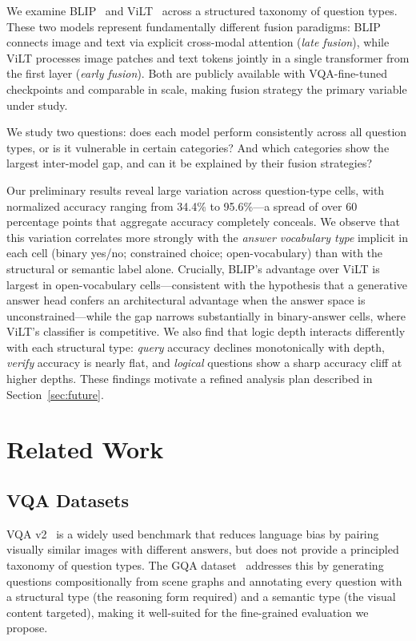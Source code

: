 \documentclass[11pt]{article}
\begin{document}
We examine BLIP~\cite{li2022blip} and ViLT~\cite{kim2021vilt} across a structured taxonomy of question types. These two models represent fundamentally different fusion paradigms: BLIP connects image and text via explicit cross-modal attention (\emph{late fusion}), while ViLT processes image patches and text tokens jointly in a single transformer from the first layer (\emph{early fusion}). Both are publicly available with VQA-fine-tuned checkpoints and comparable in scale, making fusion strategy the primary variable under study.

We study two questions: does each model perform consistently across all question types, or is it vulnerable in certain categories? And which categories show the largest inter-model gap, and can it be explained by their fusion strategies?

Our preliminary results reveal large variation across question-type cells, with normalized accuracy ranging from 34.4\% to 95.6\%---a spread of over 60 percentage points that aggregate accuracy completely conceals. We observe that this variation correlates more strongly with the \emph{answer vocabulary type} implicit in each cell (binary yes/no; constrained choice; open-vocabulary) than with the structural or semantic label alone. Crucially, BLIP's advantage over ViLT is largest in open-vocabulary cells---consistent with the hypothesis that a generative answer head confers an architectural advantage when the answer space is unconstrained---while the gap narrows substantially in binary-answer cells, where ViLT's classifier is competitive. We also find that logic depth interacts differently with each structural type: \textit{query} accuracy declines monotonically with depth, \textit{verify} accuracy is nearly flat, and \textit{logical} questions show a sharp accuracy cliff at higher depths. These findings motivate a refined analysis plan described in Section~\ref{sec:future}.

\section{Related Work}

\subsection{VQA Datasets}
VQA v2~\cite{goyal2017making} is a widely used benchmark that reduces language bias by pairing visually similar images with different answers, but does not provide a principled taxonomy of question types. The GQA dataset~\cite{hudson2019gqa} addresses this by generating questions compositionally from scene graphs and annotating every question with a structural type (the reasoning form required) and a semantic type (the visual content targeted), making it well-suited for the fine-grained evaluation we propose.
\end{document}
